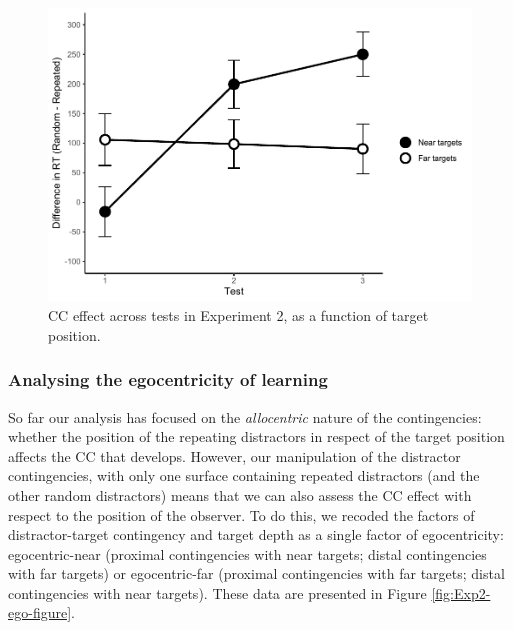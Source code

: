 \documentclass[
  english,
  man,floatsintext]{apa7}
\begin{document}
\begin{figure}

{\centering \includegraphics[width=1\linewidth]{CCVR_manuscript_files/figure-latex/Exp2-CC-figure-1} 

}

\caption{CC effect across tests in Experiment 2, as a function of target position.}\label{fig:Exp2-CC-figure}
\end{figure}

\hypertarget{analysing-the-egocentricity-of-learning}{%
\subsubsection{Analysing the egocentricity of learning}\label{analysing-the-egocentricity-of-learning}}

So far our analysis has focused on the \emph{allocentric} nature of the contingencies: whether the position of the repeating distractors in respect of the target position affects the CC that develops. However, our manipulation of the distractor contingencies, with only one surface containing repeated distractors (and the other random distractors) means that we can also assess the CC effect with respect to the position of the observer. To do this, we recoded the factors of distractor-target contingency and target depth as a single factor of egocentricity: egocentric-near (proximal contingencies with near targets; distal contingencies with far targets) or egocentric-far (proximal contingencies with far targets; distal contingencies with near targets). These data are presented in Figure \ref{fig:Exp2-ego-figure}.
\end{document}
